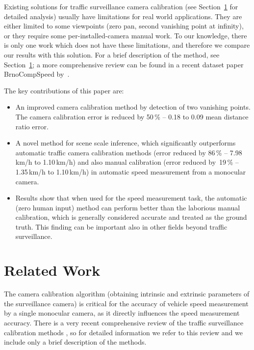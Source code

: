 \documentclass[]{elsarticle}
\begin{document}
Existing solutions for traffic surveillance camera calibration \citep{Dailey2000,Schoepflin2003,Cathey2005,Grammatikopoulos2005,He2007,Maduro2008,Sina2013,Nurhadiyatna2013,Dubska2014,Lan2014,Luvizon2014,Dubska2015ITS,Do2015,Luvizon2016,You2016} (see Section~\ref{sec:SOTASpeedMeasurement} for detailed analysis) usually have limitations for real world applications. They are either limited to some viewpoints (zero pan, second vanishing point at infinity), or they require some per-installed-camera manual work. To our knowledge, there is only one work \citep{Dubska2014} which does not have these limitations, and therefore we compare our results with this solution. For a brief description of the method, see Section~\ref{sec:SOTASpeedMeasurement}; a more comprehensive review can be found in a recent dataset paper BrnoCompSpeed by~\cite{BrnoCompSpeed}.

The key contributions of this paper are:
\begin{itemize}
	\item An improved camera calibration method by detection of two vanishing points. The camera calibration error is reduced by 50\,\% -- 0.18 to 0.09 mean distance ratio error.
	\item A novel method for scene scale inference, which significantly outperforms  automatic traffic camera calibration methods (error reduced by 86\,\% -- 7.98\,km/h to 1.10\,km/h) and also manual calibration (error reduced by~19\,\% -- 1.35\,km/h to 1.10\,km/h) in automatic speed measurement from a monocular camera.
	\item Results show that when used for the speed measurement task, the automatic (zero human input) method can perform better than the laborious manual calibration, which is generally considered accurate and treated as the ground truth. This finding can be important also in other fields beyond traffic surveillance.
\end{itemize}


\section{Related Work} \label{sec:SOTASpeedMeasurement}
The camera calibration algorithm (obtaining intrinsic and extrinsic parameters of the surveillance camera) is critical for the accuracy of vehicle speed measurement by a single monocular camera, as it directly influences the speed measurement accuracy. There is a very recent comprehensive review of the traffic surveillance calibration methods \citep{BrnoCompSpeed}, so for detailed information we refer to this review and we include only a brief description of the methods. 
\end{document}
